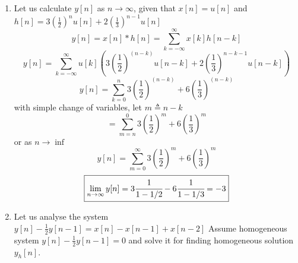 \documentclass[a4paper,12pt]{article}
\begin{document}
\begin{enumerate}
		
		
	
	\item Let us calculate $y[n]$ as $n \to \infty$, given that $x[n]=u[n]$ and $h[n]=3{(\frac{1}{2})}^nu[n]+2{(\frac{1}{3})}^{n-1}u[n] $
		$$	y[n]=x[n]*h[n]=\sum_{k=-\infty}^{\infty} x[k]h[n-k]	$$
		$$	y[n]=\sum_{k=-\infty}^{\infty} u[k](3{(\frac{1}{2})}^{(n-k)}u[n-k]+2{(\frac{1}{3})}^{n-k-1}u[n-k])	$$
		$$	y[n]=\sum_{k=0}^{n} 3{(\frac{1}{2})}^{(n-k)}+6{(\frac{1}{3})}^{(n-k)}	$$
		with simple change of variables, let $m\triangleq n-k$
		$$	=\sum_{m=n}^{0} 3{(\frac{1}{2})}^m +6{(\frac{1}{3})}^m	$$
		or as $n \to \inf$
		$$ y[n]= \sum_{m=0}^{\infty} 3{(\frac{1}{2})}^m +6{(\frac{1}{3})}^m $$
		$$	\boxed{\lim_{n \to \infty} y[n]=3\cfrac{1}{1-1/2}-6\cfrac{1}{1-1/3}=-3}	$$
	\item Let us analyse the system $y[n]-\frac{1}{2}y[n-1]=x[n]-x[n-1]+x[n-2]$
	Assume homogeneous system $y[n]-\frac{1}{2}y[n-1]=0$ and solve it for finding homogeneous solution $y_h[n]$.
	

\end{enumerate}
\end{document}
